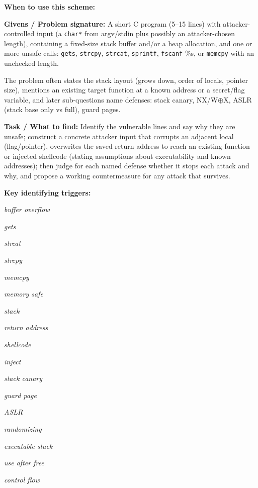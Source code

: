 \documentclass[12pt, a4paper]{article}
\begin{document}
\textbf{When to use this scheme:}

\textbf{Givens / Problem signature:}
A short C program (5--15 lines) with attacker-controlled input (a \texttt{char*} from argv/stdin plus possibly an attacker-chosen length), containing a fixed-size stack buffer and/or a heap allocation, and one or more unsafe calls: \texttt{gets}, \texttt{strcpy}, \texttt{strcat}, \texttt{sprintf}, \texttt{fscanf} \%s, or \texttt{memcpy} with an unchecked length.

The problem often states the stack layout (grows down, order of locals, pointer size), mentions an existing target function at a known address or a secret/flag variable, and later sub-questions name defenses: stack canary, NX/W$\oplus$X, ASLR (stack base only vs full), guard pages.

\textbf{Task / What to find:}
Identify the vulnerable lines and say why they are unsafe; construct a concrete attacker input that corrupts an adjacent local (flag/pointer), overwrites the saved return address to reach an existing function or injected shellcode (stating assumptions about executability and known addresses); then judge for each named defense whether it stops each attack and why, and propose a working countermeasure for any attack that survives.

\textbf{Key identifying triggers:}
\begin{tightitem}
        \item \textit{buffer overflow}
        \item \textit{gets}
        \item \textit{strcat}
        \item \textit{strcpy}
        \item \textit{memcpy}
        \item \textit{memory safe}
        \item \textit{stack}
        \item \textit{return address}
        \item \textit{shellcode}
        \item \textit{inject}
        \item \textit{stack canary}
        \item \textit{guard page}
        \item \textit{ASLR}
        \item \textit{randomizing}
        \item \textit{executable stack}
        \item \textit{use after free}
        \item \textit{control flow}
    \end{tightitem}
\end{document}

